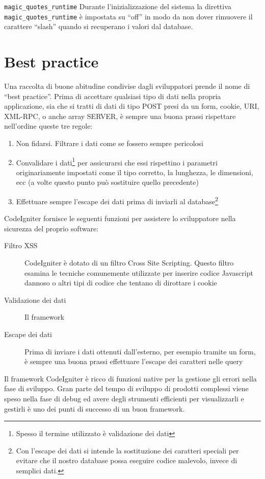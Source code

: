 \verb|magic_quotes_runtime|
Durante l'inizializzazione del sistema la direttiva \verb|magic_quotes_runtime| è impostata su ``off'' in modo da non dover rimuovere il carattere ``slash'' quando si recuperano i valori dal database.

\section{Best practice}
Una raccolta di buone abitudine condivise dagli sviluppatori prende il nome di ``best practice''. Prima di accettare qualsiasi tipo di dati nella propria applicazione, sia che si tratti di dati di tipo POST presi da un form, cookie, URI, XML-RPC, o anche array SERVER, è sempre una buona prassi rispettare nell'ordine queste tre regole:

\begin{enumerate}
\item Non fidarsi. Filtrare i dati come se fossero sempre pericolosi
\item Convalidare i dati\footnote{Spesso il termine utilizzato è validazione dei dati} per assicurarsi che essi rispettino i parametri originariamente impostati come il tipo corretto, la lunghezza, le dimensioni, ecc (a volte questo punto può sostituire quello precedente)
\item Effettuare sempre l'escape dei dati prima di inviarli al database\footnote{Con l'escape dei dati si intende la sostituzione dei caratteri speciali per evitare che il nostro database possa eseguire codice malevolo, invece di semplici dati.}
\end{enumerate}

CodeIgniter fornisce le seguenti funzioni per assistere lo sviluppatore nella sicurezza del proprio software:

\begin{description}
\item[Filtro XSS] CodeIgniter è dotato di un filtro Cross Site Scripting. Questo filtro esamina le tecniche comunemente utilizzate per inserire codice Javascript dannoso o altri tipi di codice che tentano di dirottare i cookie 
\item[Validazione dei dati] Il framework
\item[Escape dei dati] Prima di inviare i dati ottenuti dall'esterno, per esempio tramite un form, è sempre una buona prassi effettuare l'escape dei caratteri nelle query
\end{description}

Il framework CodeIgniter è ricco di funzioni native per la gestione gli errori nella fase di sviluppo. Gran parte del tempo di sviluppo di prodotti complessi viene speso nella fase di debug ed avere degli strumenti efficienti per visualizzarli e gestirli è uno dei punti di successo di un buon framework. 

